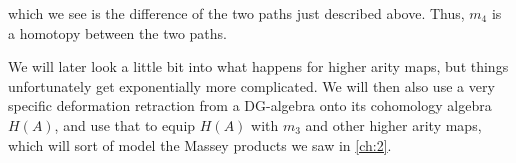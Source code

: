 which we see is the difference of the two paths just described above. Thus, $m_4$ is a homotopy between the two paths. 

We will later look a little bit into what happens for higher arity maps, but things unfortunately get exponentially more complicated. We will then also use a very specific deformation retraction from a DG-algebra onto its cohomology algebra $H(A)$, and use that to equip $H(A)$ with $m_3$ and other higher arity maps, which will sort of model the Massey products we saw in \cref{ch:2}.  
